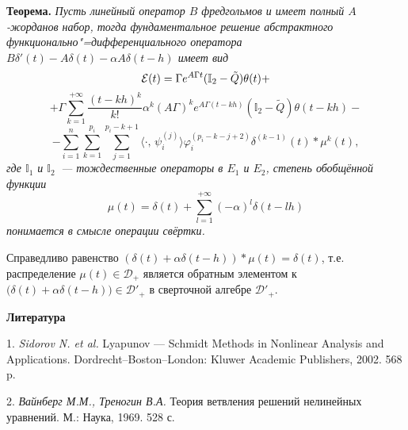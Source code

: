 \textbf{Теорема.} {\it Пусть линейный оператор $B$ фредгольмов и имеет полный $A$-жорданов набор, тогда фундаментальное решение абстрактного функционально"=дифференциального оператора $B\delta'(t)-A\delta(t)-\alpha A\delta(t-h)$ имеет вид
$$
{\cal E}(t)=\Gamma e^{A\Gamma t}({\mathbb I}_{2}-\tilde{Q})\theta(t)+
$$
$$
+\Gamma\sum\limits_{k=1}^{+\infty}\frac{(t-kh)^{k}}{k!}\alpha^{k}(A\Gamma)^k e^{A\Gamma (t-kh)}({\mathbb I}_{2}-\tilde{Q})\theta(t-kh)-
$$
$$
 -\sum\limits_{i=1}^{n}\sum\limits_{k=1}^{p_{i}}\sum\limits_{j=1}^{p_{i}-k+1}\langle\cdot,\,\psi^{(j)}_{i}\rangle\varphi^{(p_{i}-k-j+2)}_{i}\delta^{(k-1)}(t)\ast\mu^{k}(t),
$$
где ${\mathbb I}_{1}$ и ${\mathbb I}_{2}$~--- тождественные операторы в $E_{1}$ и $E_{2}$, степень обобщённой функции
$$
\mu(t)=\delta(t)+\sum\limits_{l=1}^{+\infty}(-\alpha)^{l}\delta(t-lh)
$$
понимается в смысле операции свёртки.}

Справедливо равенство $(\delta(t)+\alpha\delta(t-h))\ast\mu(t)=\delta(t)$, т.е. распределение $\mu(t)\in{\mathcal D}_{+}$ является обратным элементом к $\bigl(\delta(t)+\alpha\delta(t-h)\bigr)\in{\mathcal D}'_{+}$ в сверточной алгебре ${\mathcal D}'_{+}$.

\smallskip \centerline {\bf Литература} \nopagebreak

1. {\it Sidorov N. et al.} Lyapunov --- Schmidt Methods in Non\-linear Analysis and Applications. Dordrecht--Boston--London: Kluwer Academic Publishers, 2002. 568 p.

2. {\it Вайнберг М.М., Треногин В.А.} Теория ветвления решений нелинейных уравнений. М.: Наука, 1969. 528 с.
